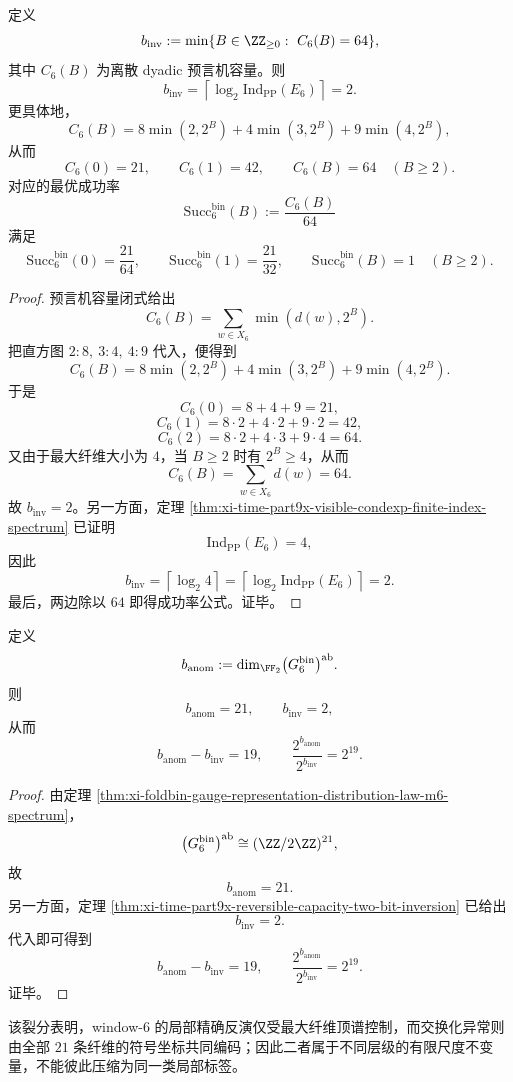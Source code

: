 \begin{theorem}\label{thm:xi-time-part9x-reversible-capacity-two-bit-inversion}
定义
\[
b_{\mathrm{inv}}
:=
\min\{B\in \ZZ_{\ge 0}:\ C_6(B)=64\},
\]
其中 \(C_6(B)\) 为离散 dyadic 预言机容量。则
\[
b_{\mathrm{inv}}
=
\left\lceil \log_2 \mathrm{Ind}_{\mathrm{PP}}(E_6)\right\rceil
=
2.
\]
更具体地，
\[
C_6(B)
=
8\min(2,2^B)+4\min(3,2^B)+9\min(4,2^B),
\]
从而
\[
C_6(0)=21,
\qquad
C_6(1)=42,
\qquad
C_6(B)=64
\quad (B\ge 2).
\]
对应的最优成功率
\[
\mathrm{Succ}_6^{\mathrm{bin}}(B):=\frac{C_6(B)}{64}
\]
满足
\[
\mathrm{Succ}_6^{\mathrm{bin}}(0)=\frac{21}{64},
\qquad
\mathrm{Succ}_6^{\mathrm{bin}}(1)=\frac{21}{32},
\qquad
\mathrm{Succ}_6^{\mathrm{bin}}(B)=1
\quad (B\ge 2).
\]
\end{theorem}
\begin{proof}
预言机容量闭式给出
\[
C_6(B)=\sum_{w\in X_6}\min(d(w),2^B).
\]
把直方图 \(2:8,\ 3:4,\ 4:9\) 代入，便得到
\[
C_6(B)
=
8\min(2,2^B)+4\min(3,2^B)+9\min(4,2^B).
\]
于是
\[
C_6(0)=8+4+9=21,
\]
\[
C_6(1)=8\cdot 2+4\cdot 2+9\cdot 2=42,
\]
\[
C_6(2)=8\cdot 2+4\cdot 3+9\cdot 4=64.
\]
又由于最大纤维大小为 \(4\)，当 \(B\ge 2\) 时有 \(2^B\ge 4\)，从而
\[
C_6(B)=\sum_{w\in X_6}d(w)=64.
\]
故 \(b_{\mathrm{inv}}=2\)。另一方面，定理
\ref{thm:xi-time-part9x-visible-condexp-finite-index-spectrum} 已证明
\[
\mathrm{Ind}_{\mathrm{PP}}(E_6)=4,
\]
因此
\[
b_{\mathrm{inv}}
=
\left\lceil \log_2 4\right\rceil
=
\left\lceil \log_2 \mathrm{Ind}_{\mathrm{PP}}(E_6)\right\rceil
=
2.
\]
最后，两边除以 \(64\) 即得成功率公式。证毕。
\end{proof}

\begin{theorem}[解码维数与异常维数的十九比特裂分]\label{thm:xi-time-part9x-decoding-anomaly-nineteen-bit-gap}
定义
\[
b_{\mathrm{anom}}
:=
\dim_{\FF_2}\bigl(G_6^{\mathrm{bin}}\bigr)^{\mathrm{ab}}.
\]
则
\[
b_{\mathrm{anom}}=21,
\qquad
b_{\mathrm{inv}}=2,
\]
从而
\[
b_{\mathrm{anom}}-b_{\mathrm{inv}}=19,
\qquad
\frac{2^{b_{\mathrm{anom}}}}{2^{b_{\mathrm{inv}}}}=2^{19}.
\]
\end{theorem}
\begin{proof}
由定理 \ref{thm:xi-foldbin-gauge-representation-distribution-law-m6-spectrum}，
\[
\bigl(G_6^{\mathrm{bin}}\bigr)^{\mathrm{ab}}
\cong
(\ZZ/2\ZZ)^{21},
\]
故
\[
b_{\mathrm{anom}}=21.
\]
另一方面，定理 \ref{thm:xi-time-part9x-reversible-capacity-two-bit-inversion} 已给出
\[
b_{\mathrm{inv}}=2.
\]
代入即可得到
\[
b_{\mathrm{anom}}-b_{\mathrm{inv}}=19,
\qquad
\frac{2^{b_{\mathrm{anom}}}}{2^{b_{\mathrm{inv}}}}=2^{19}.
\]
证毕。
\end{proof}

\noindent
该裂分表明，window-\(6\) 的局部精确反演仅受最大纤维顶谱控制，而交换化异常则由全部 \(21\) 条纤维的符号坐标共同编码；因此二者属于不同层级的有限尺度不变量，不能彼此压缩为同一类局部标签。

\endinput
